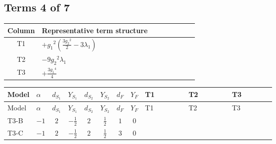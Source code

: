 \documentclass[8pt]{article}
\begin{document}
\begin{landscape}
\subsection*{Terms 4 of 7}
\begin{center}
\begin{tabular}{@{}c >{\raggedright\arraybackslash}p{0.82\linewidth}@{}}
\toprule
Column & Representative term structure \\
\midrule
T1 & \(\displaystyle +{g_1}^2 \left(\frac{3 {g_2}^2}{2}-3 {\lambda_1}\right)\) \\
\midrule
T2 & \(\displaystyle -9 {g_2}^2 {\lambda_1}\) \\
\midrule
T3 & \(\displaystyle +\frac{3 {g_1}^4}{4}\) \\
\midrule
\bottomrule
\end{tabular}
\end{center}
\smallskip
\tiny
\begin{longtable}{@{}llcccccc >{\raggedright\arraybackslash}p{0.21\linewidth} >{\raggedright\arraybackslash}p{0.21\linewidth} >{\raggedright\arraybackslash}p{0.21\linewidth}@{}}
\toprule
Model & $\alpha$ & $d_{S_1}$ & $Y_{S_1}$ & $d_{S_2}$ & $Y_{S_2}$ & $d_F$ & $Y_F$ & T1 & T2 & T3 \\
\midrule
\endfirsthead
\toprule
Model & $\alpha$ & $d_{S_1}$ & $Y_{S_1}$ & $d_{S_2}$ & $Y_{S_2}$ & $d_F$ & $Y_F$ & T1 & T2 & T3 \\
\midrule
\endhead
T3-B & $-1$ & $2$ & $-\frac{1}{2}$ & $2$ & $\frac{1}{2}$ & $1$ & $0$ & \scriptsize\adjustbox{max width=\linewidth}{$\begin{gathered} +{g_1}^2 \left(\frac{3 {g_2}^2}{2}-3 {\lambda_1}\right)\end{gathered}$} & \scriptsize\adjustbox{max width=\linewidth}{$\begin{gathered} -9 {g_2}^2 {\lambda_1}\end{gathered}$} & \scriptsize\adjustbox{max width=\linewidth}{$\begin{gathered} +\frac{3 {g_1}^4}{4}\end{gathered}$} \\
\midrule
T3-C & $-1$ & $2$ & $-\frac{1}{2}$ & $2$ & $\frac{1}{2}$ & $3$ & $0$ & \scriptsize\adjustbox{max width=\linewidth}{$\begin{gathered} +{g_1}^2 \left(\frac{3 {g_2}^2}{2}-3 {\lambda_1}\right)\end{gathered}$} & \scriptsize\adjustbox{max width=\linewidth}{$\begin{gathered} -9 {g_2}^2 {\lambda_1}\end{gathered}$} & \scriptsize\adjustbox{max width=\linewidth}{$\begin{gathered} +\frac{3 {g_1}^4}{4}\end{gathered}$} \\

\end{longtable}
\end{landscape}
\end{document}
